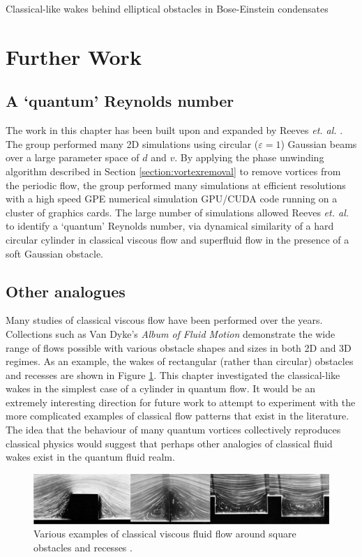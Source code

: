 \begin{chapter}{\label{cha:wake}Classical-like wakes behind elliptical obstacles in Bose-Einstein condensates}
\section{Further Work}
\subsection{A `quantum' Reynolds number}
The work in this chapter has been built upon and expanded by Reeves \emph{et. al.} \cite{reeves_2015}. The group performed many 2D simulations using circular ($\varepsilon=1$) Gaussian beams over a large parameter space of $d$ and $v$. By applying the phase unwinding algorithm described in Section \ref{section:vortexremoval} to remove vortices from the periodic flow, the group performed many simulations at efficient resolutions with a high speed GPE numerical simulation GPU/CUDA code running on a cluster of graphics cards. The large number of simulations allowed Reeves \emph{et. al.} to identify a `quantum' Reynolds number, via dynamical similarity of a hard circular cylinder in classical viscous flow and superfluid flow in the presence of a soft Gaussian obstacle.

\subsection{Other analogues}
Many studies of classical viscous flow have been performed over the years. Collections such as Van Dyke's {\it Album of Fluid Motion} \cite{nagib} demonstrate the wide range of flows possible with various obstacle shapes and sizes in both 2D and 3D regimes. As an example, the wakes of rectangular (rather than circular) obstacles and recesses are shown in Figure \ref{fig:dyke-imgs}. This chapter investigated the classical-like wakes in the simplest case of a cylinder in quantum flow. It would be an extremely interesting direction for future work to attempt to experiment with the more complicated examples of classical flow patterns that exist in the literature. The idea that the behaviour of many quantum vortices collectively reproduces classical physics would suggest that perhaps other analogies of classical fluid wakes exist in the quantum fluid realm. 
\begin{figure}
\centering
    \includegraphics[width=\linewidth]{wake/square.png}
  \caption{Various examples of classical viscous fluid flow around square obstacles and recesses \cite{nagib}.} 
  \label{fig:dyke-imgs}
\end{figure}
\end{chapter}
